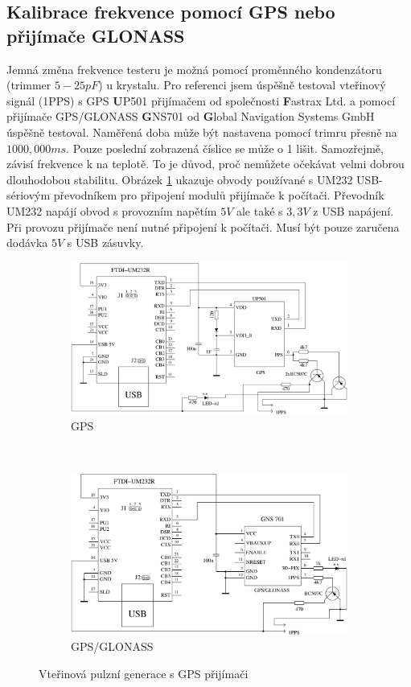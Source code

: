 \subsection{Kalibrace frekvence pomocí GPS nebo přijímače GLONASS}
Jemná změna frekvence testeru je možná pomocí proměnného kondenzátoru (trimmer \(5-25pF\)) u krystalu.
Pro referenci jsem úspěšně testoval vteřinový signál (1PPS) s GPS {\textbf UP501} přijímačem od společnosti {\textbf Fastrax Ltd.} a
pomocí přijímače GPS/GLONASS {\textbf GNS701} od {\textbf Global Navigation Systems GmbH} úspěšně testoval.
Naměřená doba může být nastavena pomocí trimru přesně na \(1000,000ms\).
Pouze poslední zobrazená číslice se může o 1 lišit.
Samozřejmě, závisí frekvence k na teplotě.
To je důvod, proč nemůžete očekávat velmi dobrou dlouhodobou stabilitu.
Obrázek \ref{fig:GPS-1PPS} ukazuje obvody používané s UM232 USB-sériovým převodníkem pro
připojení modulů přijímače k ​​počítači.
Převodník UM232 napájí obvod s provozním napětím \(5V\) ale také s \(3,3V\) z USB napájení.
\\Při provozu přijímače není nutné připojení k počítači.
Musí být pouze zaručena dodávka \(5V\) s USB zásuvky.

\begin{figure}[H]
  \begin{subfigure}[b]{.5\textwidth}
    \centering
    \includegraphics[width=.95\textwidth]{../FIG/GPS_UP501.pdf}
    \caption{GPS}
  \end{subfigure}
  ~
  \begin{subfigure}[b]{.5\textwidth}
    \centering
    \includegraphics[width=.95\textwidth]{../FIG/GPS_GNS701.pdf}
    \caption{GPS/GLONASS}
  \end{subfigure}
  \caption{Vteřinová pulzní generace s GPS přijímači}
  \label{fig:GPS-1PPS}
\end{figure}

